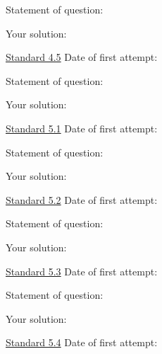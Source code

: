 \documentclass[12pt]{article}
\begin{document}
\bigskip

Statement of question:

\vspace{1in}

Your solution:

\newpage


\underline{Standard 4.5} \hspace{6cm} Date of first attempt:



\bigskip

Statement of question:

\vspace{1in}

Your solution:

\newpage


\underline{Standard 5.1} \hspace{6cm} Date of first attempt:



\bigskip

Statement of question:

\vspace{1in}

Your solution:

\newpage


\underline{Standard 5.2} \hspace{6cm} Date of first attempt:



\bigskip

Statement of question:

\vspace{1in}

Your solution:

\newpage


\underline{Standard 5.3} \hspace{6cm} Date of first attempt:



\bigskip

Statement of question:

\vspace{1in}

Your solution:

\newpage


\underline{Standard 5.4} \hspace{6cm} Date of first attempt:
\end{document}
